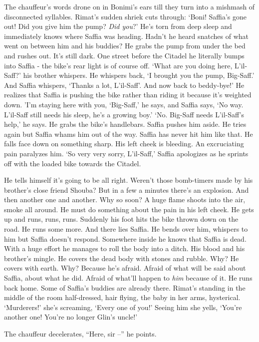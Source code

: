 \documentclass[twoside,11pt]{book}
\begin{document}
The chauffeur's words drone on in Bonimi's ears till they turn into a mishmash of disconnected syllables. Rimat's sudden
shriek cuts through: `Boni! Saffia's gone out! Did you give him the pump? \textit{Did you}?' He's torn from deep
sleep and immediately knows where Saffia was heading. Hadn't he heard snatches of what went on between him and his
buddies? He grabs the pump from under the bed and rushes out. It's still dark. One street before the Citadel he
literally bumps into Saffia - the bike's rear light is of course off. `What are you doing here, L'il-Saff?' his
brother whispers. He whispers back, `I brought you the pump, Big-Saff.' And Saffia whispers, `Thanks a lot, L'il-Saff'.
And now back to beddy-bye!' He realizes that Saffia is pushing the bike rather than riding it because
it's weighted down. 'I'm staying here with you, `Big-Saff,' he says, and Saffia says, `No way. L'il-Saff still needs
his sleep, he's a growing boy.' `No. Big-Saff needs L'il-Saff's help,' he says. He grabs the bike's handlebars.
Saffia pushes him aside. He tries again but Saffia whams him out of the way. Saffia has never hit him like that. He
falls face down on something sharp. His left cheek is bleeding. An excruciating pain paralyzes
 him. `So very very sorry, L'il-Saff,' Saffia apologizes as he sprints off with the loaded bike towards the Citadel.

He tells himself it's going to be all right. Weren't those bomb-timers made by his brother's close friend Shouba? But
in a few a minutes there's an explosion. And then another one and another. Why so soon? A huge flame shoots into the
air, smoke all around. He must do something about the pain in his left cheek. He gets up and runs, runs, runs. Suddenly
his foot hits the bike thrown down on the road. He runs some more. And there lies Saffia. He bends over him, whispers
to him but Saffia doesn't respond. Somewhere inside he knows that Saffia is dead. With a huge effort he manages to roll
the body into a ditch. His blood and his brother's mingle. He covers the dead body with stones and
rubble. Why? He covers with earth. Why? Because he's afraid.  Afraid of what will be said about Saffia, about what he
did. Afraid of what'll happen to \textit{him} because of it. He runs back home. Some of Saffia's buddies are already
there. Rimat's standing in the middle of the room half-dressed, hair flying, the baby in her arms, hysterical.
`Murderers!' she's screaming, `Every one of you!' Seeing him she yells, `You're another one! You're no
longer Glin's uncle!'

The chauffeur decelerates, ``Here, sir --'' he points.
\end{document}

